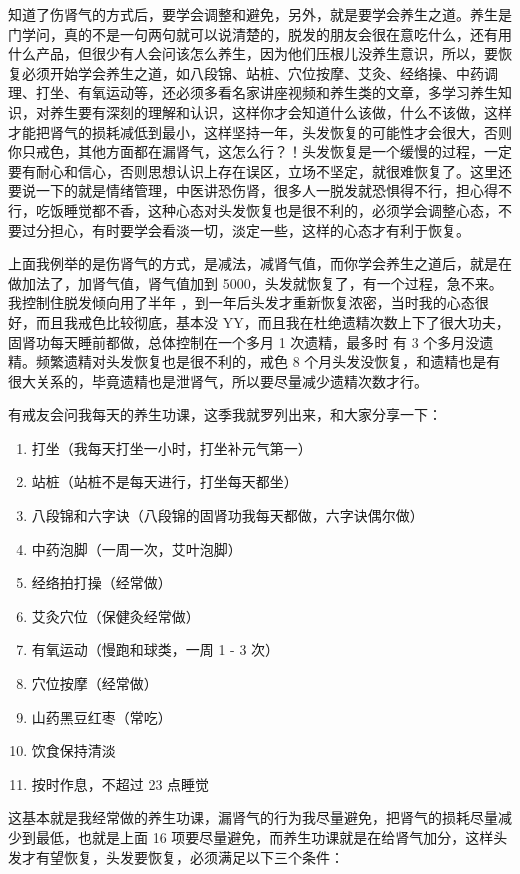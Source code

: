 \documentclass{ctexart}
\begin{document}
知道了伤肾气的方式后，要学会调整和避免，另外，就是要学会养生之道。养生是门学问，真的不是一句两句就可以说清楚的，脱发的朋友会很在意吃什么，还有用什么产品，但很少有人会问该怎么养生，因为他们压根儿没养生意识，所以，要恢复必须开始学会养生之道，如八段锦、站桩、穴位按摩、艾灸、经络操、中药调理、打坐、有氧运动等，还必须多看名家讲座视频和养生类的文章，多学习养生知识，对养生要有深刻的理解和认识，这样你才会知道什么该做，什么不该做，这样才能把肾气的损耗减低到最小，这样坚持一年，头发恢复的可能性才会很大，否则你只戒色，其他方面都在漏肾气，这怎么行？！头发恢复是一个缓慢的过程，一定要有耐心和信心，否则思想认识上存在误区，立场不坚定，就很难恢复了。这里还要说一下的就是情绪管理，中医讲恐伤肾，很多人一脱发就恐惧得不行，担心得不行，吃饭睡觉都不香，这种心态对头发恢复也是很不利的，必须学会调整心态，不要过分担心，有时要学会看淡一切，淡定一些，这样的心态才有利于恢复。

上面我例举的是伤肾气的方式，是减法，减肾气值，而你学会养生之道后，就是在做加法了，加肾气值，肾气值加到 5000，头发就恢复了，有一个过程，急不来。我控制住脱发倾向用了半年 ，到一年后头发才重新恢复浓密，当时我的心态很好，而且我戒色比较彻底，基本没 YY，而且我在杜绝遗精次数上下了很大功夫，固肾功每天睡前都做，总体控制在一个多月 1 次遗精，最多时 有 3 个多月没遗精。频繁遗精对头发恢复也是很不利的，戒色 8 个月头发没恢复，和遗精也是有很大关系的，毕竟遗精也是泄肾气，所以要尽量减少遗精次数才行。

有戒友会问我每天的养生功课，这季我就罗列出来，和大家分享一下：

\begin{enumerate}
    \item 打坐（我每天打坐一小时，打坐补元气第一）
    \item 站桩（站桩不是每天进行，打坐每天都坐）
    \item 八段锦和六字诀（八段锦的固肾功我每天都做，六字诀偶尔做）
    \item 中药泡脚（一周一次，艾叶泡脚）
    \item 经络拍打操（经常做）
    \item 艾灸穴位（保健灸经常做）
    \item 有氧运动（慢跑和球类，一周 1 - 3 次）
    \item 穴位按摩（经常做）
    \item 山药黑豆红枣（常吃）
    \item 饮食保持清淡
    \item 按时作息，不超过 23 点睡觉
\end{enumerate}

这基本就是我经常做的养生功课，漏肾气的行为我尽量避免，把肾气的损耗尽量减少到最低，也就是上面 16 项要尽量避免，而养生功课就是在给肾气加分，这样头发才有望恢复，头发要恢复，必须满足以下三个条件：
\end{document}
